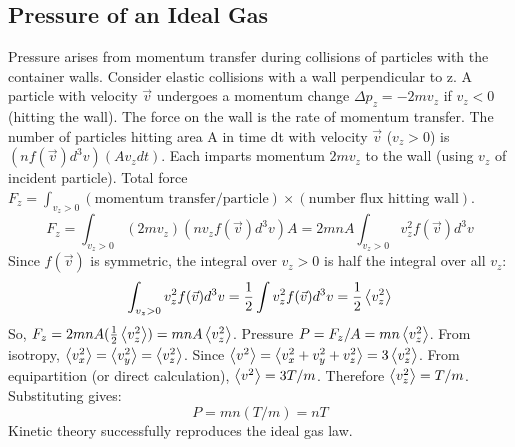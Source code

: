 \documentclass[10pt, letterpaper]{article}
\newcommand{\avg}[1]{\expval{#1}} %
\begin{document}
\subsection{Pressure of an Ideal Gas}
Pressure arises from momentum transfer during collisions of particles with the container walls. Consider elastic collisions with a wall perpendicular to z. A particle with velocity $\vec{v}$ undergoes a momentum change $\Delta p_z = -2 m v_z$ if $v_z < 0$ (hitting the wall).
The force on the wall is the rate of momentum transfer. The number of particles hitting area A in time dt with velocity $\vec{v}$ ($v_z>0$) is $(n f(\vec{v}) d^3v) (A v_z dt)$. Each imparts momentum $2 m v_z$ to the wall (using $v_z$ of incident particle).
Total force $F_z = \int_{v_z>0} (\text{momentum transfer/particle}) \times (\text{number flux hitting wall})$.
\begin{equation*}
    F_z = \int_{v_z>0} (2 m v_z) (n v_z f(\vec{v}) d^3v) A = 2 m n A \int_{v_z>0} v_z^2 f(\vec{v}) d^3v
\end{equation*}
Since $f(\vec{v})$ is symmetric, the integral over $v_z>0$ is half the integral over all $v_z$:
\begin{equation*}
    \int_{v_z>0} v_z^2 f(\vec{v}) d^3v = \frac{1}{2} \int v_z^2 f(\vec{v}) d^3v = \frac{1}{2} \avg{v_z^2}
\end{equation*}
So, $F_z = 2 m n A (\frac{1}{2} \avg{v_z^2}) = m n A \avg{v_z^2}$.
Pressure $P = F_z / A = m n \avg{v_z^2}$.
From isotropy, $\avg{v_x^2} = \avg{v_y^2} = \avg{v_z^2}$. Since $\avg{v^2} = \avg{v_x^2+v_y^2+v_z^2} = 3 \avg{v_z^2}$.
From equipartition (or direct calculation), $\avg{v^2} = 3T/m$. Therefore $\avg{v_z^2} = T/m$.
Substituting gives:
\begin{equation}
    P = m n (T/m) = n T
\end{equation}
Kinetic theory successfully reproduces the ideal gas law.

\end{document}
